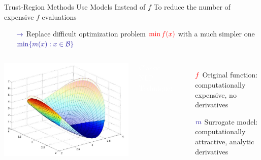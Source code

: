 \documentclass[handout,aspectratio=54]{beamer}
\numberwithin{theorem}{section}
\begin{document}
\begin{frame}{Trust-Region Methods Use Models Instead of $f$}
To reduce the number of expensive $f$ evaluations
\begin{itemize}
\item[$\textcolor{blue}{\rightarrow}$] Replace difficult optimization problem $\textcolor{red}{\min f(x)}$ with a much simpler one $\textcolor{blue}{\min\{m(x) : x\in \mathcal{B}\}}$
\end{itemize}

\begin{columns}
\includegraphics[width=\textwidth]{fig/21.jpg}

\colorbox[rgb]{0.5,0.6,0.7}{\textcolor{white}{Classic NLP Technique:}}
\begin{itemize}
\item[$\textcolor{red}{f}$]  Original function: computationally expensive, no derivatives
\item[$\textcolor{blue}{m}$] Surrogate model: computationally attractive, analytic derivatives
\end{itemize}
\end{columns}
\end{frame}
\end{document}
